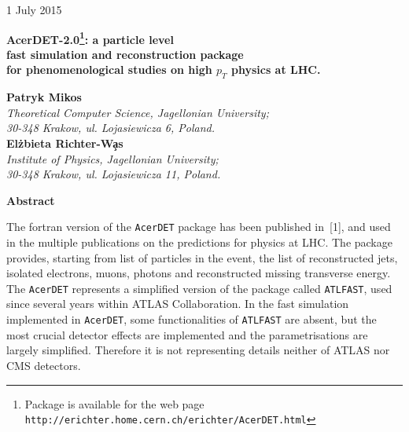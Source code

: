 \begin{titlepage}

\begin{flushright}
{\rm   1 July  2015}
\end{flushright}


\begin{center}
\vspace{2.0cm} 
  {\bf \LARGE AcerDET-2.0\footnote{Package is available for the web page 
  {\tt http://erichter.home.cern.ch/erichter/AcerDET.html}}: a particle level } \\
\vspace{0.25cm} 
  {\bf \LARGE fast simulation and reconstruction package} \\
\vspace{0.25cm} 
  {\bf \LARGE for  phenomenological studies on high $p_T$ physics at LHC.}\\
\end{center}
\vspace{1.0cm} 
 

\begin{center}
  {\bf Patryk Mikos}\\ 
  {\em Theoretical Computer Science, Jagellonian University;}\\
  {\em 30-348 Krakow, ul. Lojasiewicza 6, Poland.}\\
   {\bf El\. zbieta Richter-W\c{a}s}\\ 
  {\em Institute of Physics, Jagellonian University;}\\
  {\em 30-348 Krakow, ul. Lojasiewicza 11, Poland.}\\
 
\end{center}

\vspace{1.0cm}
\begin{center}
{\bf Abstract}
\end{center}


The fortran version of the  {\tt AcerDET} package has been published in~[1],
and used in the multiple publications on the predictions for physics at LHC.
The package provides, starting from list of particles in the event, the list of 
reconstructed jets, isolated electrons, muons, photons and
reconstructed missing transverse energy.
The {\tt AcerDET} represents a simplified version of the package called
{\tt ATLFAST}, used since several years within ATLAS Collaboration.
In the fast simulation implemented in {\tt AcerDET}, some functionalities of 
{\tt ATLFAST} are absent, but the most crucial detector effects are
implemented and the  parametrisations are largely simplified.
Therefore it is not representing details neither of ATLAS nor
CMS detectors. 


\end{titlepage}
